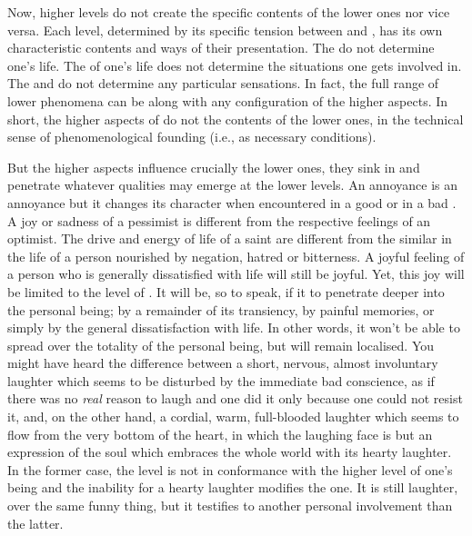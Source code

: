 
\pa\label{pa:notSchelerA}\label{notfounding}
 Now, higher levels do not create the specific contents
of the lower ones nor vice versa.  Each level, determined by its specific
tension between  and , has its own
characteristic contents and ways of their presentation.  The  do
not determine one's life.  The  of one's life does not determine the
 situations one gets involved in.  The   and
 do not determine any particular sensations.  In fact, the full
range of lower phenomena can be  along with any configuration of
the higher aspects.  In short, the higher aspects of  do not
 the contents of the lower ones, in the technical sense of phenomenological
founding (i.e., as necessary conditions).

But the higher aspects influence crucially the lower ones, they sink in and
penetrate whatever  
qualities may emerge at the lower levels. An annoyance is an annoyance 
but it changes its character when encountered in a good or in a bad 
. A joy or sadness of a pessimist is different from the 
respective feelings of an optimist. The drive and energy of life of a 
saint are different from the similar  in the life of 
a person nourished by negation, hatred or bitterness. 
%
A joyful feeling of a person who is generally dissatisfied with life will still
be joyful.  Yet, this joy will be limited to the level of .  It
will be, so to speak,  if it  to penetrate deeper into
the personal being;  by a remainder of its transiency, by painful
memories, or simply  by the general dissatisfaction with life.  In
other words, it won't be able to spread over the totality of the personal being,
but will remain localised.  You might have heard the difference between a short,
nervous, almost involuntary laughter which seems to be disturbed by the
immediate bad conscience, as if there was no {\em real} reason to laugh and one
did it only because one could not resist it, and, on the other hand, a cordial,
warm, full-blooded laughter which seems to flow from the very bottom of the
heart, in which the laughing face is but an expression of the soul which
embraces the whole world with its hearty laughter.  In the former case, the
 level is not in conformance with the higher level of one's being and
the inability for a hearty laughter modifies the  one.  It is still
laughter, over the same funny thing, but it testifies to another personal
involvement than the latter.

